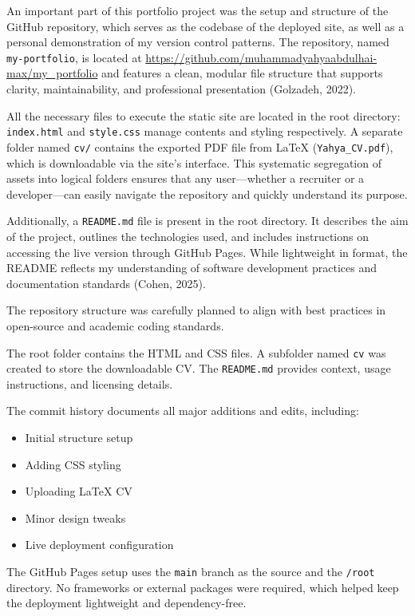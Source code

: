 \documentclass[11pt,a4paper]{article}
\begin{document}
An important part of this portfolio project was the setup and structure of the GitHub repository, which serves as the codebase of the deployed site, as well as a personal demonstration of my version control patterns. The repository, named \texttt{my-portfolio}, is located at \url{https://github.com/muhammadyahyaabdulhai-max/my_portfolio} and features a clean, modular file structure that supports clarity, maintainability, and professional presentation (Golzadeh, 2022).

All the necessary files to execute the static site are located in the root directory: \texttt{index.html} and \texttt{style.css} manage contents and styling respectively. A separate folder named \texttt{cv/} contains the exported PDF file from LaTeX (\texttt{Yahya_CV.pdf}), which is downloadable via the site's interface. This systematic segregation of assets into logical folders ensures that any user—whether a recruiter or a developer—can easily navigate the repository and quickly understand its purpose.

Additionally, a \texttt{README.md} file is present in the root directory. It describes the aim of the project, outlines the technologies used, and includes instructions on accessing the live version through GitHub Pages. While lightweight in format, the README reflects my understanding of software development practices and documentation standards (Cohen, 2025).

The repository structure was carefully planned to align with best practices in open-source and academic coding standards.

The root folder contains the HTML and CSS files. A subfolder named \texttt{cv} was created to store the downloadable CV. The \texttt{README.md} provides context, usage instructions, and licensing details.

The commit history documents all major additions and edits, including:

\begin{itemize}
    \item Initial structure setup
    \item Adding CSS styling
    \item Uploading LaTeX CV
    \item Minor design tweaks
    \item Live deployment configuration
\end{itemize}

The GitHub Pages setup uses the \texttt{main} branch as the source and the \texttt{/root} directory. No frameworks or external packages were required, which helped keep the deployment lightweight and dependency-free.
\end{document}
